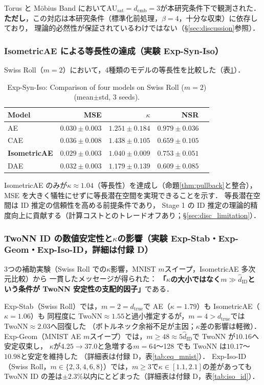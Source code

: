 \documentclass[11pt,a4paper]{jsarticle}
\newcommand{\kap}{\kappa}
\newcommand{\AUsat}{\mathrm{AU}_{\mathrm{sat}}}
\newcommand{\demb}{d_{\mathrm{emb}}}
\begin{document}
Torus と Möbius Band において$\AUsat = \demb = 3$が本研究条件下で観測された．
\textbf{ただし}，この対応は本研究条件（標準化前処理，$\beta = 4$，十分な収束）に依存しており，
理論的必然性が保証されているわけではない（§\ref{sec:discussion}参照）．

\subsubsection{IsometricAE による等長性の達成（実験 Exp-Syn-Iso）}

Swiss Roll（$m = 2$）において，4種類のモデルの等長性を比較した（表\ref{tab:ec}）．

\begin{table}[H]
\centering
\caption{Exp-Syn-Iso: Comparison of four models on Swiss Roll ($m=2$) (mean$\pm$std, 3 seeds).}
\label{tab:ec}
\small
\begin{tabular}{lrrrr}
\toprule
Model & MSE & $\kap$ & NSR \\
\midrule
AE & $0.030\pm0.003$ & $1.251\pm0.184$ & $0.979\pm0.036$ \\
CAE & $0.036\pm0.008$ & $1.438\pm0.105$ & $0.659\pm0.105$ \\
\textbf{IsometricAE} & $\boldsymbol{0.029\pm0.003}$ & $\boldsymbol{1.040\pm0.009}$ & $0.753\pm0.051$ \\
DAE & $0.032\pm0.003$ & $1.179\pm0.139$ & $0.609\pm0.085$ \\
\bottomrule
\end{tabular}
\end{table}

IsometricAE のみが$\kap \approx 1.04$（等長性）を達成し（命題\ref{thm:pullback}と整合），
MSE を大きく犠牲にせずに等長潜在空間を実現できることを示す．
等長潜在空間は ID 推定の信頼性を高める前提条件であり，
Stage 1 の ID 推定の理論的精度向上に貢献する（計算コストとのトレードオフあり；§\ref{sec:disc_limitation}）．

\subsubsection{TwoNN ID の数値安定性と$\kap$の影響（実験 Exp-Stab・Exp-Geom・Exp-Iso-ID，詳細は付録 D）}\label{sec:exp_ep}

3つの補助実験（Swiss Roll での$\kap$影響，MNIST $m$スイープ，IsometricAE 多次元比較）から
一貫したメッセージが得られた：
\textbf{「$\kap$の大小ではなく$m \gg \hat{d}_\mathrm{ID}$という条件が TwoNN 安定性の支配的因子」}である．

Exp-Stab（Swiss Roll）では，$m=2=d_\mathrm{true}$で AE（$\kap=1.79$）も IsometricAE（$\kap=1.06$）も
同程度に TwoNN$\approx1.55$と過小推定するが，$m=4>d_\mathrm{true}$では TwoNN$\approx2.03$へ回復した
（ボトルネック余裕不足が主因；$\kap$差の影響は軽微）．
Exp-Geom（MNIST AE $m$スイープ）では，$m \geq 48 \approx 5\hat{d}_\mathrm{ID}$で TwoNN が$10.16$へ安定収束し，
$\kap$が$4.25 \to 37.0$と急増する$m=64$〜128 でも TwoNN は$10.17$〜$10.98$と安定を維持した
（詳細表は付録 D，表\ref{tab:eq_mnist}）．
Exp-Iso-ID（Swiss Roll，$m \in \{2,3,4,6,8\}$）では，$m \geq 3$で$\kap \in [1.1, 2.1]$の差があっても
TwoNN ID の差は$\pm2.3\%$以内にとどまった（詳細表は付録 D，表\ref{tab:iso_id}）．
\end{document}
